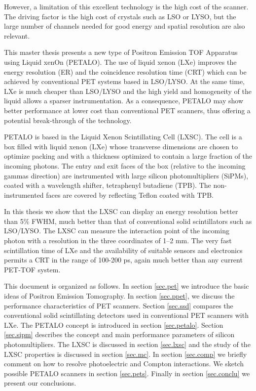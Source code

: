 \documentclass[12pt,a4paper,english,twoside]{article}
\begin{document}
However, a limitation of this excellent technology is the high cost of the scanner. The driving factor is the high cost of crystals such as LSO or LYSO, but the large number of channels needed for good energy and spatial resolution are also relevant. 

This master thesis presents a new type of Positron Emission TOF Apparatus using Liquid xenOn (PETALO). The use of liquid xenon (LXe) improves the energy resolution (ER) and the coincidence resolution time (CRT) which can be achieved by conventional PET systems based in LSO/LYSO. At the same time, LXe is much cheaper than LSO/LYSO and the high yield and homogeneity of the liquid allows a sparser instrumentation. As a consequence, PETALO may show better performance at lower cost than conventional PET scanners, thus offering a potential break-through of the technology.  

PETALO is based in the  Liquid Xenon Scintillating Cell (LXSC).  The cell is a box filled with liquid xenon (LXe) whose transverse dimensions are chosen to optimize packing and with a thickness optimized to contain a large fraction of the incoming photons. The entry and exit faces of the box (relative to the incoming gammas direction) are instrumented with large silicon photomultipliers (SiPMs), coated with a wavelength shifter, tetraphenyl butadiene (TPB). The non-instrumented faces are covered by reflecting Teflon coated with TPB. 

In this thesis we show that the LXSC can display an energy resolution better than 5\% FWHM, much better than that of conventional solid scintillators such as LSO/LYSO. The LXSC can measure the interaction point of the incoming photon with a resolution in the three coordinates of 1--2 mm. The very fast scintillation time of LXe  and the availability of suitable sensors and electronics permits a CRT in the range of 100-200 ps, again much better than any current PET-TOF system. 

This document is organized as follows. In section \ref{sec.pet} we introduce the basic ideas of Positron Emission Tomography. In section \ref{sec.ppet}, we discuss the performance characteristics of PET scanners. Section \ref{sec.ssd} compares the conventional solid scintillating detectors used in conventional PET scanners with LXe. The PETALO concept is introduced in section \ref{sec.petalo}. Section \ref{sec.sipm} describes the concept and main performance parameters of silicon photomultipliers. The LXSC is discussed in section \ref{sec.lxsc} and the study of the LXSC properties is discussed in section \ref{sec.mc}. In section \ref{sec.comp} we briefly comment on how to resolve photoelectric and Compton interactions. We sketch possible PETALO scanners in section \ref{sec.pets}. Finally in section \ref{sec.conclu} we present our conclusions. 
\end{document}
